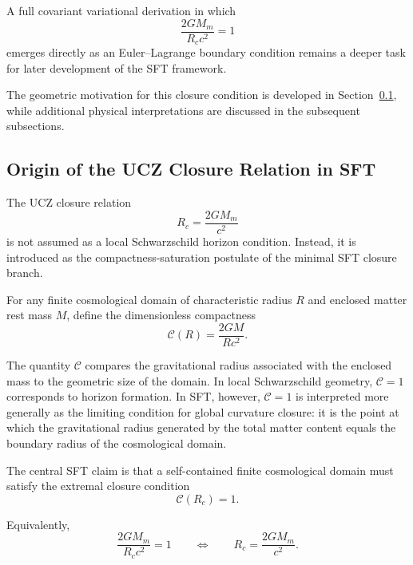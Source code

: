 \documentclass[12pt]{article}
\begin{document}
A full covariant variational derivation in which
\[
\frac{2GM_m}{R_c c^2}=1
\]
emerges directly as an Euler--Lagrange boundary condition remains a
deeper task for later development of the SFT framework.

The geometric motivation for this closure condition is developed in
Section~\ref{subsec:origin_ucz_closure}, while additional physical
interpretations are discussed in the subsequent subsections.


\subsection{Origin of the UCZ Closure Relation in SFT}
\label{subsec:origin_ucz_closure}

The UCZ closure relation
\begin{equation}
R_c=\frac{2GM_m}{c^2}
\label{eq:ucz_origin}
\end{equation}
is not assumed as a local Schwarzschild horizon condition. Instead, it
is introduced as the compactness-saturation postulate of the minimal
SFT closure branch.

For any finite cosmological domain of characteristic radius $R$ and enclosed
matter rest mass $M$, define the dimensionless compactness
\begin{equation}
\mathcal{C}(R)
=
\frac{2GM}{Rc^2}.
\label{eq:compactness_def}
\end{equation}

The quantity $\mathcal{C}$ compares the gravitational radius associated with
the enclosed mass to the geometric size of the domain. In local Schwarzschild
geometry, $\mathcal{C}=1$ corresponds to horizon formation. In SFT, however,
$\mathcal{C}=1$ is interpreted more generally as the limiting condition for
global curvature closure: it is the point at which the gravitational radius
generated by the total matter content equals the boundary radius of the
cosmological domain.

The central SFT claim is that a self-contained finite cosmological domain must
satisfy the extremal closure condition
\begin{equation}
\boxed{
\mathcal{C}(R_c)=1.
}
\label{eq:compactness_saturation}
\end{equation}

Equivalently,
\begin{equation}
\boxed{
\frac{2GM_m}{R_c c^2}=1
}
\qquad
\Longleftrightarrow
\qquad
\boxed{
R_c=\frac{2GM_m}{c^2}.
}
\label{eq:ucz_saturation}
\end{equation}
\end{document}
